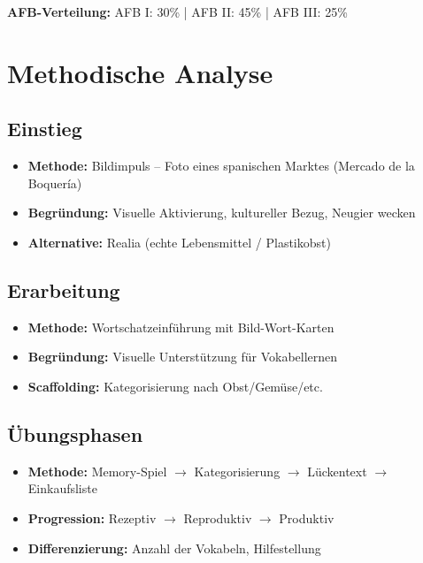 \documentclass[11pt,a4paper]{article}
\begin{document}
\vspace{1em}
\textbf{AFB-Verteilung:} AFB I: 30\% | AFB II: 45\% | AFB III: 25\%

\section{Methodische Analyse}

\subsection{Einstieg}
\begin{itemize}
    \item \textbf{Methode:} Bildimpuls -- Foto eines spanischen Marktes (Mercado de la Boquería)
    \item \textbf{Begründung:} Visuelle Aktivierung, kultureller Bezug, Neugier wecken
    \item \textbf{Alternative:} Realia (echte Lebensmittel / Plastikobst)
\end{itemize}

\subsection{Erarbeitung}
\begin{itemize}
    \item \textbf{Methode:} Wortschatzeinführung mit Bild-Wort-Karten
    \item \textbf{Begründung:} Visuelle Unterstützung für Vokabellernen
    \item \textbf{Scaffolding:} Kategorisierung nach Obst/Gemüse/etc.
\end{itemize}

\subsection{Übungsphasen}
\begin{itemize}
    \item \textbf{Methode:} Memory-Spiel $\rightarrow$ Kategorisierung $\rightarrow$ Lückentext $\rightarrow$ Einkaufsliste
    \item \textbf{Progression:} Rezeptiv $\rightarrow$ Reproduktiv $\rightarrow$ Produktiv
    \item \textbf{Differenzierung:} Anzahl der Vokabeln, Hilfestellung
\end{itemize}
\end{document}
